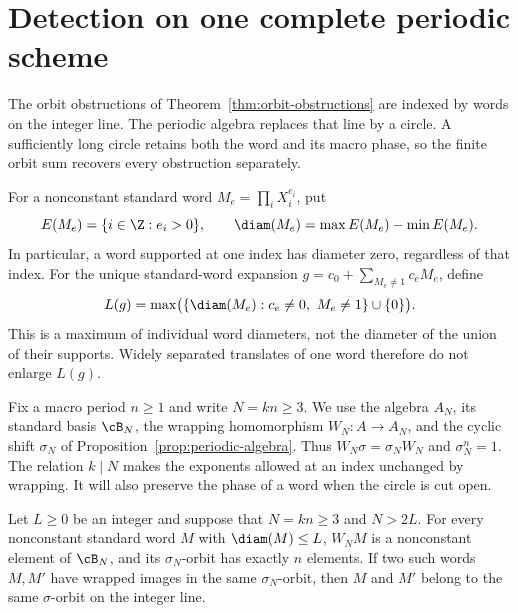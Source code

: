 \section{Detection on one complete periodic scheme}
\label{sec:periodic-detection}

The orbit obstructions of Theorem~\ref{thm:orbit-obstructions} are indexed by
words on the integer line.  The periodic algebra replaces that line by a
circle.  A sufficiently long circle retains both the word and its macro
phase, so the finite orbit sum recovers every obstruction separately.

For a nonconstant standard word $M_e=\prod_i X_i^{e_i}$, put
\[
 E(M_e)=\{i\in\Z:e_i>0\},\qquad
 \diam(M_e)=\max E(M_e)-\min E(M_e).
\]
In particular, a word supported at one index has diameter zero, regardless
of that index.  For the unique standard-word expansion
$g=c_0+\sum_{M_e\ne1}c_eM_e$, define
\[
 L(g)=\max\bigl(\{\diam(M_e):c_e\ne0,\ M_e\ne1\}\cup\{0\}\bigr).
\]
This is a maximum of individual word diameters, not the diameter of the
union of their supports.  Widely separated translates of one word therefore
do not enlarge $L(g)$.

Fix a macro period $n\ge1$ and write $N=kn\ge3$.  We use the algebra
$A_N$, its standard basis $\cB_N$, the wrapping homomorphism
$W_N:A\to A_N$, and the cyclic shift $\sigma_N$ of
Proposition~\ref{prop:periodic-algebra}.  Thus
$W_N\sigma=\sigma_NW_N$ and $\sigma_N^n=1$.  The relation
$k\mid N$ makes the exponents allowed at an index unchanged by wrapping.
It will also preserve the phase of a word when the circle is cut open.

\begin{lemma}\label{lem:no-alias}
Let $L\ge0$ be an integer and suppose that $N=kn\ge3$ and $N>2L$.
For every nonconstant standard word $M$ with $\diam(M)\le L$,
$W_NM$ is a nonconstant element of $\cB_N$, and its
$\sigma_N$-orbit has exactly $n$ elements.  If two such words $M,M'$
have wrapped images in the same $\sigma_N$-orbit, then $M$ and $M'$
belong to the same $\sigma$-orbit on the integer line.
\end{lemma}

